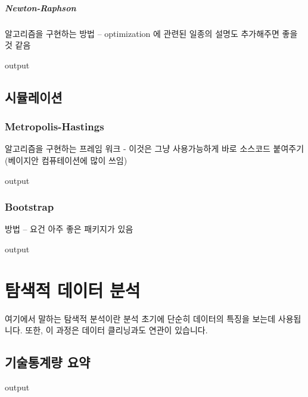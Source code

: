 \paragraph{Newton-Raphson} 알고리즘을 구현하는 방법 -- optimization 에 관련된 일종의 설명도 추가해주면 좋을 것 같음 
\begin{Schunk}
\begin{Soutput}
output
\end{Soutput}
\end{Schunk}



\section{시뮬레이션}
\subsection{Metropolis-Hastings} 알고리즘을 구현하는 프레임 워크 - 이것은 그냥 사용가능하게 바로 소스코드 붙여주기 (베이지안 컴퓨테이션에 많이 쓰임)
\begin{Schunk}
\begin{Soutput}
output
\end{Soutput}
\end{Schunk}

\subsection{Bootstrap} 
방법 -- 요건 아주 좋은 패키지가 있음 
\begin{Schunk}
\begin{Soutput}
output
\end{Soutput}
\end{Schunk}


%
%
%

\chapter{탐색적 데이터 분석}

여기에서 말하는 탐색적 분석이란 분석 초기에 단순히 데이터의 특징을 보는데 사용됩니다. 
또한, 이 과정은 데이터 클리닝과도 연관이 있습니다. 

\section{기술통계량 요약}
\begin{Schunk}
\begin{Soutput}
output
\end{Soutput}
\end{Schunk}

